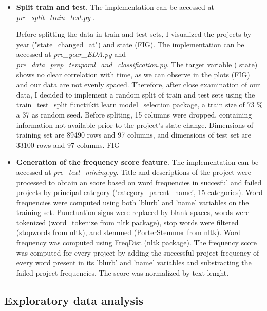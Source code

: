 \documentclass{article}
\begin{document}
{\begin{itemize}
    Data dimension after filtering was 122590 rows and 112 columns.
    
    To be able to extract category keywords associated to successful or failed projects, data were splitted in training and test sets at this point.
    
    \item \textbf{Split train and test}.
    The implementation can be accessed at \emph{pre\_split\_train\_test.py }.
    
    Before splitting the data in train and test sets, I visualized the projects by year ("state\_changed\_at") and state (FIG). The implementation can be accessed at \emph{pre\_year\_EDA.py} and \emph{pre\_data\_prep\_temporal\_and\_classification.py}. The target variable ( state) shows no clear correlation with time, as we can observe in the plots (FIG) and our data are not evenly spaced. Therefore, after close examination of our data, I decided to implement a random split of train and test sets using the train\_test\_split functiikit learn model\_selection package, a train size of 73 \% a 37 as random seed. Before spliting, 15 columns were dropped, containing information not available prior to the project's state change. Dimensions of training set are 89490 rows and 97 columns, and dimensions of test set are 33100 rows and 97 columns. 
    FIG 

	
    \item \textbf{Generation of the frequency score feature}.
    The implementation can be accessed at \emph{pre\_text\_mining.py}.
    Title and descriptions of the project were processed to obtain an score based on word frequencies in succesful and failed projects by principal category ('category\_parent\_name', 15 categories). Word  frequencies were computed using both 'blurb' and 'name' variables on the training set. Punctuation signs were replaced by blank spaces, words were tokenized (word\_tokenize from nltk package), stop words were filtered (stopwords from nltk), and stemmed (PorterStemmer from nltk). Word frequency was computed using FreqDist (nltk package). The frequency score was computed for every project by adding the successful project frequency of every word present in its 'blurb' and 'name' variables and substracting the failed project frequencies. The score was normalized by text lenght.  

\end{itemize}

\subsection{Exploratory data analysis}
\label{subsec:EDA}
\begin{itemize}


\end{itemize}}
\end{document}
